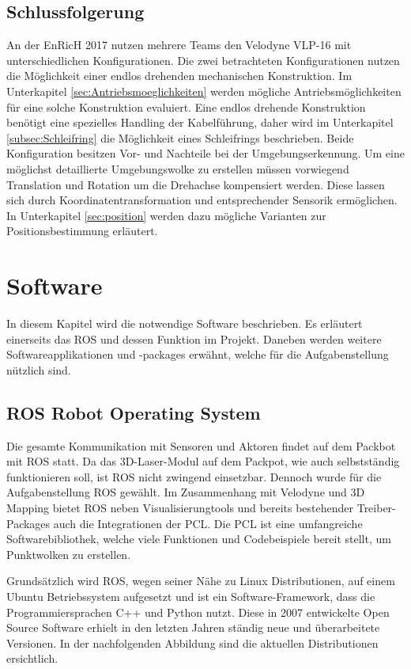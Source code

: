 \subsection{Schlussfolgerung}
An der \ac{EnRicH} 2017 nutzen mehrere Teams den Velodyne VLP-16 mit unterschiedlichen Konfigurationen. Die zwei betrachteten Konfigurationen nutzen die Möglichkeit einer endlos drehenden mechanischen Konstruktion. Im Unterkapitel \ref{sec:Antriebsmoeglichkeiten} werden mögliche Antriebsmöglichkeiten für eine solche Konstruktion evaluiert. Eine endlos drehende Konstruktion benötigt eine spezielles Handling der Kabelführung, daher wird im Unterkapitel \ref{subsec:Schleifring} die Möglichkeit eines Schleifrings beschrieben. Beide Konfiguration besitzen Vor- und Nachteile bei der Umgebungserkennung. Um eine möglichst detaillierte Umgebungswolke zu erstellen müssen vorwiegend Translation und Rotation um die Drehachse kompensiert werden. Diese lassen sich durch Koordinatentransformation und entsprechender Sensorik ermöglichen. In Unterkapitel \ref{sec:position} werden dazu mögliche Varianten zur Positionsbestimmung erläutert.
  

\section{Software}
\label{sec:Software}
In diesem Kapitel wird die notwendige Software beschrieben. Es erläutert einerseits das \ac{ROS} und dessen Funktion im Projekt. Daneben werden weitere Softwareapplikationen und -packages erwähnt, welche für die Aufgabenstellung nützlich sind.

\subsection{ROS Robot Operating System}
\label{subsec:ROS}
Die gesamte Kommunikation mit Sensoren und Aktoren findet auf dem Packbot mit \ac{ROS} statt. Da das 3D-Laser-Modul auf dem Packpot, wie auch selbstständig funktionieren soll, ist ROS nicht zwingend einsetzbar. Dennoch wurde für die Aufgabenstellung ROS gewählt. Im Zusammenhang mit Velodyne und 3D Mapping bietet ROS neben Visualisierungtools und bereits bestehender Treiber-Packages auch die Integrationen der \ac{PCL}. Die \ac{PCL} ist eine umfangreiche Softwarebibliothek, welche viele Funktionen und Codebeispiele bereit stellt, um Punktwolken zu erstellen.

Grundsätzlich wird \ac{ROS}, wegen seiner Nähe zu Linux Distributionen, auf einem Ubuntu Betriebssystem aufgesetzt und ist ein Software-Framework, dass die Programmiersprachen C++ und Python nutzt. Diese in 2007 entwickelte Open Source Software erhielt in den letzten Jahren ständig neue und überarbeitete Versionen. In der nachfolgenden Abbildung sind die aktuellen Distributionen ersichtlich.

